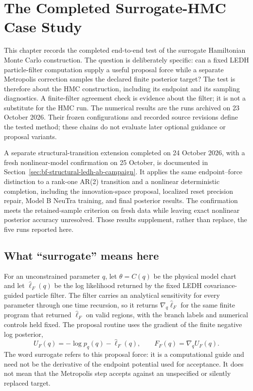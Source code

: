 \chapter{The Completed Surrogate-HMC Case Study}
\label{ch:bf-surrogate-hmc-five-models}

This chapter records the completed end-to-end test of the surrogate Hamiltonian
Monte Carlo construction.  The question is deliberately specific: can a fixed
LEDH particle-filter computation supply a useful proposal force while a separate
Metropolis correction samples the declared finite posterior target?  The test
is therefore about the HMC construction, including its endpoint and its
sampling diagnostics.  A finite-filter agreement check is evidence about the
filter; it is not a substitute for the HMC run.  The numerical results are the
runs archived on 23 October 2026.  Their frozen configurations and recorded
source revisions define the tested method; these chains do not evaluate later
optional guidance or proposal variants.

A separate structural-transition extension completed on 24 October 2026,
with a fresh nonlinear-model confirmation on 25 October, is
documented in Section~\ref{sec:bf-structural-ledh-ab-campaign}.  It applies the
same endpoint--force distinction to a rank-one AR(2) transition and a nonlinear
deterministic completion, including the innovation-space proposal, localized
reset precision repair, Model B NeuTra training, and final posterior results.
The confirmation meets the retained-sample criterion on fresh data while
leaving exact nonlinear posterior accuracy unresolved.
Those results supplement, rather than replace, the five runs reported here.

\section{What ``surrogate'' means here}
\label{sec:bf-surrogate-meaning}

For an unconstrained parameter $q$, let $\theta=C(q)$ be the physical model
chart and let $\widehat\ell_F(q)$ be the log likelihood returned by the fixed
LEDH covariance-guided particle filter.  The filter carries an analytical
sensitivity for every parameter through one time recursion, so it returns
$\nabla_q\widehat\ell_F$ for the same finite program that returned
$\widehat\ell_F$ on valid regions, with the branch labels and numerical controls held fixed.  The proposal routine uses the gradient of the finite negative log posterior,
\begin{equation}
 U_F(q)=-\log p_q(q)-\widehat\ell_F(q),\qquad F_F(q)=\nabla_q U_F(q).
 \label{eq:bf-surrogate-filter-force}
\end{equation}
The word surrogate refers to this proposal force: it is a computational guide
and need not be the derivative of the endpoint potential used for acceptance.
It does not mean that the Metropolis step accepts against an unspecified or
silently replaced target.

